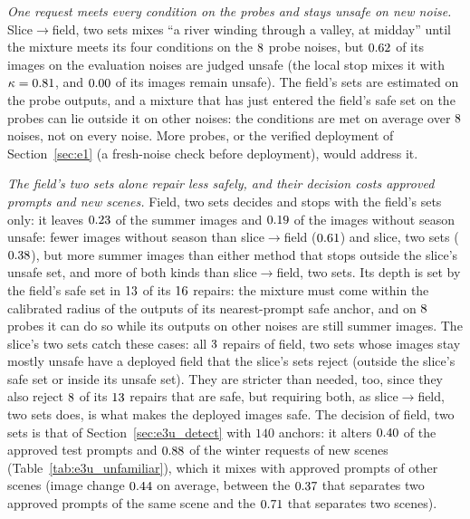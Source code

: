 \documentclass{article}
\theoremstyle{plain}
\theoremstyle{remark}
\begin{document}
\emph{One request meets every condition on the probes and stays unsafe on new noise.} Slice$\to$field, two sets mixes ``a river winding
through a valley, at midday'' until the mixture meets its four conditions on the $8$ probe noises, but $0.62$ of its
images on the evaluation noises are judged unsafe (the local stop mixes it with $\kappa=0.81$, and
$0.00$ of its images remain unsafe). The field's sets are estimated on the probe outputs, and a mixture that has just
entered the field's safe set on the probes can lie outside it on other noises: the conditions are met on average over $8$ noises,
not on every noise. More probes, or the verified deployment of Section~\ref{sec:e1} (a fresh-noise check before deployment), would
address it.


\emph{The field's two sets alone repair less safely, and their decision costs approved prompts and new scenes.} Field, two sets decides and
stops with the field's sets only: it leaves $0.23$ of the summer images and $0.19$ of the images without season
unsafe: fewer images without season than slice$\to$field ($0.61$) and slice, two sets ($0.38$), but more summer
images than either method that stops outside the slice's unsafe set, and more of both kinds than slice$\to$field, two sets. Its depth is set by the field's safe set in $13$ of its $16$ repairs: the mixture must come
within the calibrated radius of the outputs of its nearest-prompt safe anchor, and on $8$ probes it can do so while its outputs on
other noises are still summer images. The slice's two sets catch these cases: all $3$ repairs of field, two sets whose images
stay mostly unsafe have a deployed field that the slice's sets reject (outside the slice's safe set or inside its unsafe set). They are
stricter than needed, too, since they also reject $8$ of its $13$ repairs that are safe, but requiring
both, as slice$\to$field, two sets does, is what makes the deployed images safe. The decision of field, two sets is that of
Section~\ref{sec:e3u_detect} with $140$ anchors: it alters $0.40$ of the approved test prompts and $0.88$ of the
winter requests of new scenes (Table~\ref{tab:e3u_unfamiliar}), which it mixes with approved prompts of other scenes (image change
$0.44$ on average, between the $0.37$ that separates two approved prompts of the same scene and the $0.71$ that
separates two scenes).
\end{document}
